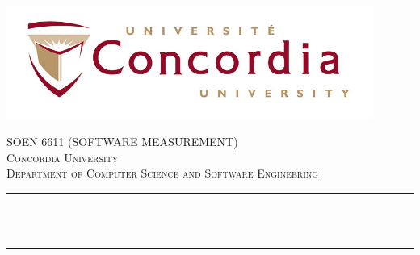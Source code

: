 \begin{titlepage}

\newcommand{\HRule}{\rule{\linewidth}{0.5mm}} %


\includegraphics[width=12cm]{title/concordia-logo.jpg}\\[2cm] %
 

\center %


\textsc{\LARGE SOEN 6611 (SOFTWARE MEASUREMENT)}\\[1.75cm] %
\textsc{\Large Concordia University}\\[0.5cm] %
\textsc{\large Department of Computer Science and Software Engineering}\\[0.5cm] %

\makeatletter
\HRule \\[0.4cm]
{ \huge \bfseries \@title}\\[0.4cm] %
\HRule \\[1.5cm]
 


\end{titlepage}
